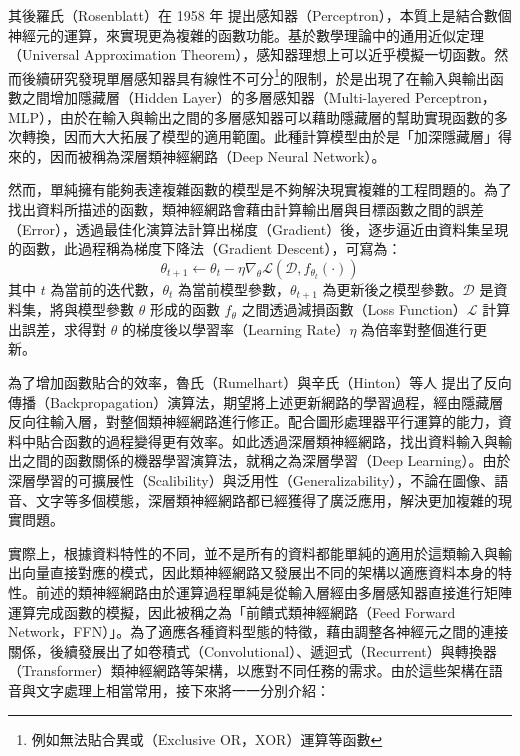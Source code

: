 其後羅氏（Rosenblatt）在 1958 年 \cite{rosenblatt_perceptron_1958} 提出感知器（Perceptron），本質上是結合數個神經元的運算，來實現更為複雜的函數功能。基於數學理論中的通用近似定理（Universal Approximation Theorem）\cite{funahashi_approximate_1989}，感知器理想上可以近乎模擬一切函數。然而後續研究發現單層感知器具有線性不可分\footnote{例如無法貼合異或（Exclusive OR，XOR）運算等函數}的限制，於是出現了在輸入與輸出函數之間增加隱藏層（Hidden Layer）的多層感知器（Multi-layered Perceptron，MLP），由於在輸入與輸出之間的多層感知器可以藉助隱藏層的幫助實現函數的多次轉換，因而大大拓展了模型的適用範圍。此種計算模型由於是「加深隱藏層」得來的，因而被稱為深層類神經網路（Deep Neural Network）。

然而，單純擁有能夠表達複雜函數的模型是不夠解決現實複雜的工程問題的。為了找出資料所描述的函數，類神經網路會藉由計算輸出層與目標函數之間的誤差（Error），透過最佳化演算法計算出梯度（Gradient）後，逐步逼近由資料集呈現的函數，此過程稱為梯度下降法（Gradient Descent），可寫為：
$$\theta_{t+1} \leftarrow \theta_{t} - \eta \nabla_\theta\mathcal{L}(\mathcal{D}, f_{\theta_t}(\cdot))$$
其中 $t$ 為當前的迭代數，$\theta_t$ 為當前模型參數，$\theta_{t+1}$ 為更新後之模型參數。$\mathcal{D}$ 是資料集，將與模型參數 $\theta$ 形成的函數 $f_\theta$ 之間透過減損函數（Loss Function）$\mathcal{L}$ 計算出誤差，求得對 $\theta$ 的梯度後以學習率（Learning Rate）$\eta$ 為倍率對整個進行更新。

為了增加函數貼合的效率，魯氏（Rumelhart）與辛氏（Hinton）等人 \cite{rumelhart_learning_1986, rumelhart_learning_1987} 提出了反向傳播（Backpropagation）演算法，期望將上述更新網路的學習過程，經由隱藏層反向往輸入層，對整個類神經網路進行修正。配合圖形處理器平行運算的能力，資料中貼合函數的過程變得更有效率。如此透過深層類神經網路，找出資料輸入與輸出之間的函數關係的機器學習演算法，就稱之為深層學習（Deep Learning）。由於深層學習的可擴展性（Scalibility）與泛用性（Generalizability），不論在圖像、語音、文字等多個模態，深層類神經網路都已經獲得了廣泛應用，解決更加複雜的現實問題。

實際上，根據資料特性的不同，並不是所有的資料都能單純的適用於這類輸入與輸出向量直接對應的模式，因此類神經網路又發展出不同的架構以適應資料本身的特性。前述的類神經網路由於運算過程單純是從輸入層經由多層感知器直接進行矩陣運算完成函數的模擬，因此被稱之為「前饋式類神經網路（Feed Forward Network，FFN）」。為了適應各種資料型態的特徵，藉由調整各神經元之間的連接關係，後續發展出了如卷積式（Convolutional）、遞迴式（Recurrent）與轉換器（Transformer）類神經網路等架構，以應對不同任務的需求。由於這些架構在語音與文字處理上相當常用，接下來將一一分別介紹：

